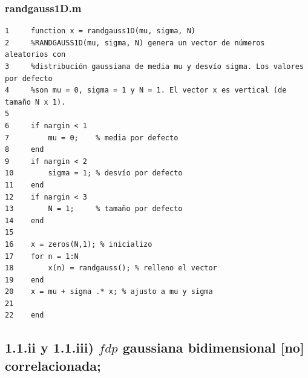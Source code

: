 \documentclass[11pt,a4paper,final]{article}
\begin{document}
\subsubsection*{randgauss1D.m}

\begin{verbatim}
1     function x = randgauss1D(mu, sigma, N)
2     %RANDGAUSS1D(mu, sigma, N) genera un vector de números aleatorios con 
3     %distribución gaussiana de media mu y desvío sigma. Los valores por defecto
4     %son mu = 0, sigma = 1 y N = 1. El vector x es vertical (de tamaño N x 1).
5     
6     if nargin < 1
7         mu = 0;    % media por defecto
8     end
9     if nargin < 2
10        sigma = 1; % desvío por defecto
11    end
12    if nargin < 3
13        N = 1;     % tamaño por defecto
14    end
15    
16    x = zeros(N,1); % inicializo
17    for n = 1:N
18        x(n) = randgauss(); % relleno el vector
19    end
20    x = mu + sigma .* x; % ajusto a mu y sigma
21    
22    end
\end{verbatim}
    

\subsection*{1.1.ii y 1.1.iii) $fdp$ gaussiana bidimensional [no] correlacionada;}
\end{document}
